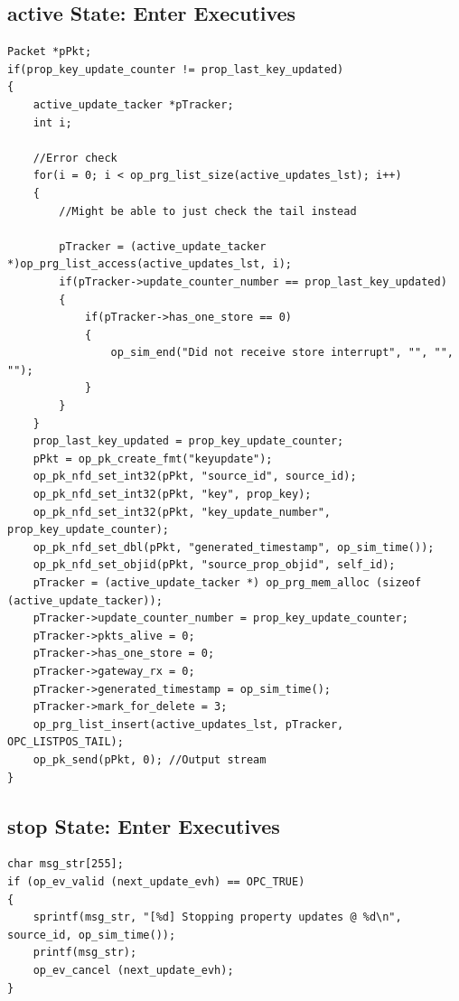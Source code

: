 \subsection{active State: Enter Executives}
{\tiny
\begin{verbatim}
Packet *pPkt;
if(prop_key_update_counter != prop_last_key_updated)
{
	active_update_tacker *pTracker;
	int i;
	
	//Error check
	for(i = 0; i < op_prg_list_size(active_updates_lst); i++)
	{
		//Might be able to just check the tail instead
	
		pTracker = (active_update_tacker *)op_prg_list_access(active_updates_lst, i);
		if(pTracker->update_counter_number == prop_last_key_updated)
		{
			if(pTracker->has_one_store == 0)
			{
				op_sim_end("Did not receive store interrupt", "", "", "");
			}
		}
	}
	prop_last_key_updated = prop_key_update_counter;
	pPkt = op_pk_create_fmt("keyupdate");
	op_pk_nfd_set_int32(pPkt, "source_id", source_id);		
	op_pk_nfd_set_int32(pPkt, "key", prop_key);	
	op_pk_nfd_set_int32(pPkt, "key_update_number", prop_key_update_counter);
	op_pk_nfd_set_dbl(pPkt, "generated_timestamp", op_sim_time());
	op_pk_nfd_set_objid(pPkt, "source_prop_objid", self_id);
	pTracker = (active_update_tacker *) op_prg_mem_alloc (sizeof (active_update_tacker));
	pTracker->update_counter_number = prop_key_update_counter;
	pTracker->pkts_alive = 0;
	pTracker->has_one_store = 0;
	pTracker->gateway_rx = 0;
	pTracker->generated_timestamp = op_sim_time();
	pTracker->mark_for_delete = 3;
	op_prg_list_insert(active_updates_lst, pTracker, OPC_LISTPOS_TAIL);	
	op_pk_send(pPkt, 0); //Output stream
}
\end{verbatim}
}

\subsection{stop State: Enter Executives}
{\tiny
\begin{verbatim}
char msg_str[255];
if (op_ev_valid (next_update_evh) == OPC_TRUE)
{
	sprintf(msg_str, "[%d] Stopping property updates @ %d\n", source_id, op_sim_time());
	printf(msg_str);
	op_ev_cancel (next_update_evh);
}
\end{verbatim}
}